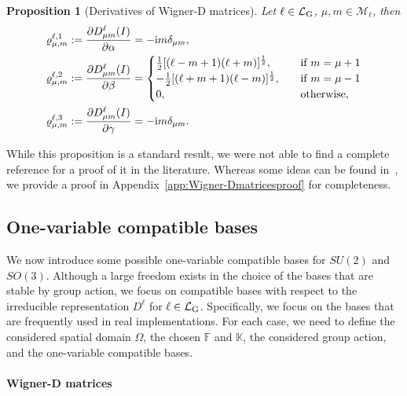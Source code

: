 \documentclass{article}
\newcommand{\vrho}[2]{\varrho^{#1}_{#2}}
\newtheorem{proposition}[theorem]{Proposition}
\numberwithin{equation}{section}
\def\K{\mathbb{K}}
\def\F{\mathbb{F}}
\def\calM{\mathcal{M}}
\def\calL{\mathcal{L}}
\def\calLG{\mathcal{\calL_{\rm G}}}
\begin{document}
{\begin{proposition}[Derivatives of Wigner-D matrices]
\label{prop:deri_alpha_gamma}
Let $\ell\in\calLG$, $\mu,m \in \calM_\ell$, then
\begin{align}
\label{eq:deri_alpha}
    \vrho{\ell,1}{\mu,m} &:=  \frac{\partial D^\ell_{\mu m}(I)}{\partial \alpha} = - \mathrm{i} m \delta_{\mu m}, \\
\label{eq:deri_beta}
     \vrho{\ell,2}{\mu,m} &:= \frac{\partial D^\ell_{\mu m}(I)}{\partial \beta} = 
    \begin{cases}
        \frac{1}{2}[(\ell-m+1)(\ell+m)]^{\frac{1}{2}},  & \quad \textup{if } m = \mu + 1\\
        -\frac{1}{2}[(\ell+m+1)(\ell-m)]^{\frac{1}{2}},  & \quad \textup{if } m = \mu - 1\\
        0, & \quad \mbox{otherwise,} \\ 
    \end{cases} 
    \\
        \vrho{\ell,3}{\mu,m} &:=  
        \frac{\partial D^\ell_{\mu m}(I)}{\partial \gamma} = - \mathrm{i} m \delta_{\mu m}.
    \label{eq:deri_gamma}
\end{align}
\end{proposition}


While this proposition is a standard result, we were not able to find a complete reference for a proof of it in the literature. Whereas some ideas can be found in~\cite{rose1995elementary}, we provide a proof in Appendix~\ref{app:Wigner-Dmatricesproof} for completeness.


\subsection{One-variable compatible bases}
\label{sec:compatible_bases}

We now introduce some possible one-variable compatible bases for $SU(2)$ and $SO(3)$. Although a large freedom exists in the choice of the bases that are stable by group action, we focus on compatible bases with respect to the irreducible representation $D^\ell$ for $\ell\in\calLG$. Specifically, we focus on the bases that are frequently used in real implementations. 
For each case, we need to define the considered spatial domain $\Omega$, the chosen $\F$ and $\K$, the considered group action, and the one-variable compatible bases.

\paragraph{Wigner-D matrices}

}
\end{document}
